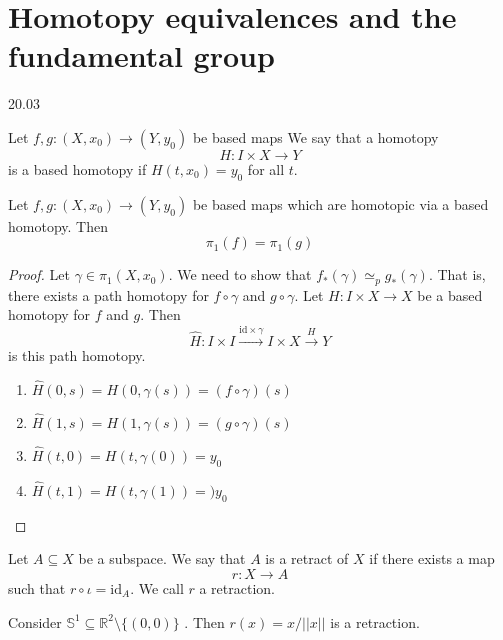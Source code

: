 \section{Homotopy equivalences and the fundamental group}
20.03

\begin{definition}
    Let \( f,g: (X, x_0) \to (Y, y_0) \) be based maps
    We say that a homotopy
    \[
      H: I \times X \to Y
    \]
    is a based homotopy if \( H(t, x_0) = y_0 \)
    for all \( t \).
\end{definition}

\begin{lemma}
  \label{lma:based_maps_homotopic}
    Let \( f, g: (X, x_0) \to (Y, y_0) \)
    be based maps which are homotopic via
    a based homotopy. Then
    \[
      \pi_1 (f) = \pi_1(g)
    \]
\end{lemma}

\begin{proof}
    Let \( \gamma \in \pi_1(X, x_0) \).
    We need to show that \( f_*(\gamma) \simeq_p g_*(\gamma) \).
    That is, there exists a path homotopy
    for \( f \circ \gamma \) and \( g \circ \gamma \).
    Let \( H: I \times X \to X \) be a based homotopy
    for \( f \) and \( g \).
    Then
    \[
      \hat{H}: I \times I \xrightarrow{\text{id} \times \gamma}
      I \times X \xrightarrow{H} Y
    \]
    is this path homotopy.
    \begin{enumerate}
      \item \( \hat{H}(0, s) = H(0, \gamma(s)) = (f \circ \gamma) (s) \)
      \item \( \hat{H}(1, s) = H(1, \gamma(s)) = (g \circ \gamma) (s) \)
      \item \( \hat{H}(t, 0) = H(t, \gamma(0)) = y_0 \)
      \item \( \hat{H}(t, 1) = H(t, \gamma(1)) = )y_0 \)
    \end{enumerate}
\end{proof}

\begin{definition}
   Let \( A \subseteq X \) be a subspace.
   We say that \( A \) is a retract of \( X \)
   if there exists a map
   \[
    r: X \to A
   \]
   such that \( r \circ \iota = \text{id}_A \).
   We call \( r \) a retraction.
\end{definition}


\begin{example}
   Consider \( \mathbb{S}^1 \subseteq \mathbb{R}^2 \setminus \{ (0, 0) \}  \) .
   Then \( r(x) = x / \lvert \lvert x \rvert \rvert \) is a retraction.
\end{example}

